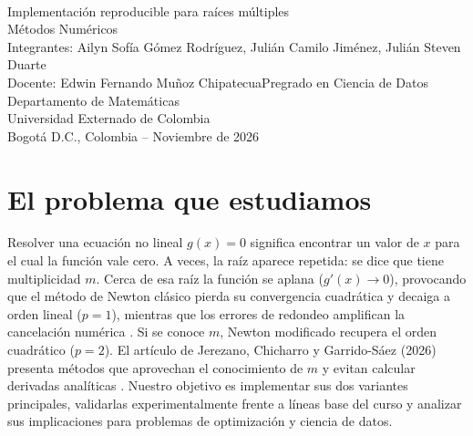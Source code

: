 \documentclass[10pt,a4paper]{article}
\begin{document}
\begin{titlepage}\centering\vspace*{2cm}{\LARGE\bfseries Proyecto Integrador: Segunda Entrega}\\[.5cm]{\large Implementación reproducible para ra\'ices m\'ultiples}\\[.6cm]{\Large M\'etodos Numéricos}\\[2cm]Integrantes: Ailyn Sof\'ia Gómez Rodríguez, Juli\'an Camilo Jiménez, Juli\'an Steven Duarte\\[1cm]Docente: Edwin Fernando Mu\~noz Chipatecua\vfill Pregrado en Ciencia de Datos\\Departamento de Matemáticas\\Universidad Externado de Colombia\\Bogotá D.C., Colombia -- Noviembre de 2026\end{titlepage}
\section{El problema que estudiamos}
Resolver una ecuaci\'on no lineal $g(x)=0$ significa encontrar un valor de $x$ para el cual la funci\'on vale cero. A veces, la ra\'iz aparece repetida: se dice que tiene multiplicidad $m$. Cerca de esa ra\'iz la funci\'on se aplana ($g'(x)\to 0$), provocando que el m\'etodo de Newton cl\'asico pierda su convergencia cuadr\'atica y decaiga a orden lineal ($p=1$), mientras que los errores de redondeo amplifican la cancelaci\'on num\'erica \cite{turner}. Si se conoce $m$, Newton modificado recupera el orden cuadr\'atico ($p=2$). El art\'iculo de Jerezano, Chicharro y Garrido-S\'aez (2026) presenta m\'etodos que aprovechan el conocimiento de $m$ y evitan calcular derivadas anal\'iticas \cite{jerezano}. Nuestro objetivo es implementar sus dos variantes principales, validarlas experimentalmente frente a l\'ineas base del curso y analizar sus implicaciones para problemas de optimizaci\'on y ciencia de datos.
\end{document}

